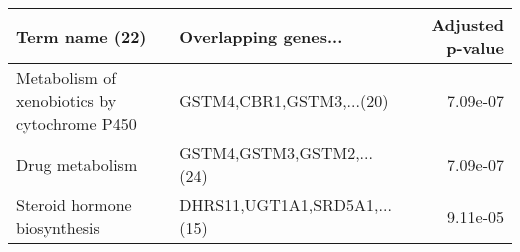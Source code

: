 \begin{tabular}{llr}
\toprule
                              Term name (22) &         Overlapping genes... &  Adjusted p-value \\
\midrule
Metabolism of xenobiotics by cytochrome P450 &     GSTM4,CBR1,GSTM3,...(20) &          7.09e-07 \\
                             Drug metabolism &    GSTM4,GSTM3,GSTM2,...(24) &          7.09e-07 \\
                Steroid hormone biosynthesis & DHRS11,UGT1A1,SRD5A1,...(15) &          9.11e-05 \\
\bottomrule
\end{tabular}
